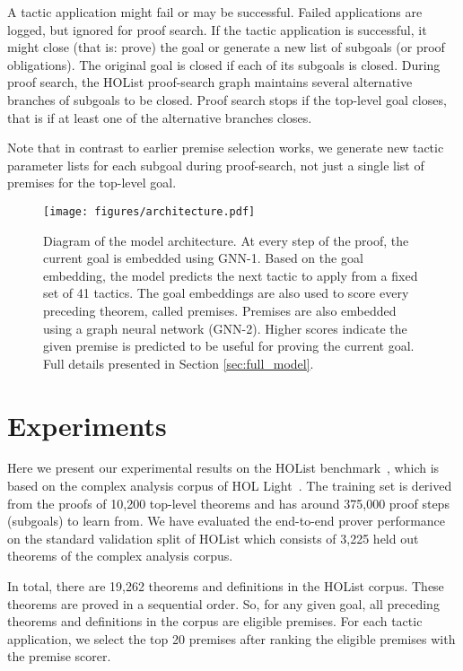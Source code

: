 \documentclass[letterpaper]{article} \usepackage{aaai20}  \usepackage{times}  \usepackage{helvet} \usepackage{courier}  \usepackage[hyphens]{url}  \usepackage{graphicx} \urlstyle{rm} \def\UrlFont{\rm}  \usepackage{graphicx}  \frenchspacing  \setlength{\pdfpagewidth}{8.5in}  \setlength{\pdfpageheight}{11in}
\newcommand{\citep}{\cite}
\begin{document}
A tactic application might fail or may be successful. Failed applications are logged, but ignored for proof search. If the tactic application is successful, it might close (that is: prove) the goal or generate a new list of subgoals (or proof obligations). The original goal is closed if each of its subgoals is closed. During proof search, the HOList proof-search graph maintains several alternative branches of subgoals to be closed. Proof search stops if the top-level goal closes, that is if at least one of the alternative branches closes.

Note that in contrast to earlier premise selection works, we generate new tactic parameter lists for each subgoal during proof-search, not just a single list of premises for the top-level goal.

\begin{figure}[t]
  \texttt{[image: figures/architecture.pdf]}
  \caption{
  Diagram of the model architecture.
  At every step of the proof, the current goal is embedded using GNN-1.
  Based on the goal embedding, the model predicts the next tactic to apply from a fixed set of 41 tactics.
  The goal embeddings are also used to score every preceding theorem, called premises.
  Premises are also embedded using a graph neural network (GNN-2).
  Higher scores indicate the given premise is predicted to be useful for proving the current goal.  Full details presented in Section \ref{sec:full_model}.
  }
  \label{fig:architecture}
\end{figure}
 \section{Experiments}
\label{sec:experiments}

Here we present our experimental results on the HOList benchmark~\citep{bansal2019holist},
which is based on the complex analysis corpus of HOL Light~\citep{Harrison96}. The training set is derived from the proofs of 10,200 top-level theorems and has around 375,000 proof steps (subgoals) to learn from. We have evaluated the end-to-end prover performance on the standard validation split of HOList which consists of 3,225 held out theorems of the complex analysis corpus.

In total, there are 19,262 theorems and definitions in the HOList corpus.  These theorems are proved in a sequential order. So, for any given goal, all preceding theorems and definitions in the corpus are eligible premises.  For each tactic application, we select the top 20 premises after ranking the eligible premises with the premise scorer.
\end{document}
